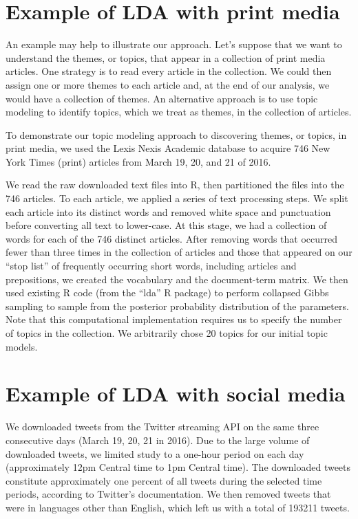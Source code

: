 \documentclass[12pt,]{article}
\begin{document}
\section{Example of LDA with print
media}\label{example-of-lda-with-print-media}

An example may help to illustrate our approach. Let's suppose that we
want to understand the themes, or topics, that appear in a collection of
print media articles. One strategy is to read every article in the
collection. We could then assign one or more themes to each article and,
at the end of our analysis, we would have a collection of themes. An
alternative approach is to use topic modeling to identify topics, which
we treat as themes, in the collection of articles.

To demonstrate our topic modeling approach to discovering themes, or
topics, in print media, we used the Lexis Nexis Academic database to
acquire 746 New York Times (print) articles from March 19, 20, and 21 of
2016.

We read the raw downloaded text files into R, then partitioned the files
into the 746 articles. To each article, we applied a series of text
processing steps. We split each article into its distinct words and
removed white space and punctuation before converting all text to
lower-case. At this stage, we had a collection of words for each of the
746 distinct articles. After removing words that occurred fewer than
three times in the collection of articles and those that appeared on our
``stop list'' of frequently occurring short words, including articles
and prepositions, we created the vocabulary and the document-term
matrix. We then used existing R code (from the ``lda'' R package) to
perform collapsed Gibbs sampling to sample from the posterior
probability distribution of the parameters. Note that this computational
implementation requires us to specify the number of topics in the
collection. We arbitrarily chose 20 topics for our initial topic models.

\section{Example of LDA with social
media}\label{example-of-lda-with-social-media}

We downloaded tweets from the Twitter streaming API on the same three
consecutive days (March 19, 20, 21 in 2016). Due to the large volume of
downloaded tweets, we limited study to a one-hour period on each day
(approximately 12pm Central time to 1pm Central time). The downloaded
tweets constitute approximately one percent of all tweets during the
selected time periods, according to Twitter's documentation. We then
removed tweets that were in languages other than English, which left us
with a total of 193211 tweets.
\end{document}
